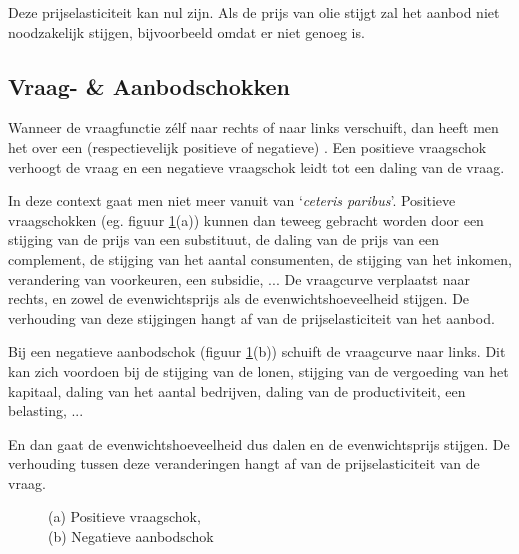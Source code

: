 Deze prijselasticiteit kan nul zijn. Als de prijs van olie stijgt zal het aanbod niet noodzakelijk stijgen, bijvoorbeeld omdat er niet genoeg is.

\subsection{Vraag- \& Aanbodschokken}\label{sec:h2veas}

Wanneer de vraagfunctie z\'elf naar rechts of naar links verschuift, dan heeft men het over een (respectievelijk positieve of negatieve) . Een positieve vraagschok verhoogt de vraag en een negatieve vraagschok leidt tot een daling van de vraag.\\

\par In deze context gaat men niet meer vanuit van `\textit{ceteris paribus}'. Positieve vraagschokken (eg. figuur \ref{fig:h2-schok}(a)) kunnen dan teweeg gebracht worden door een stijging van de prijs van een substituut, de daling van de prijs van een complement, de stijging van het aantal consumenten, de stijging van het inkomen, verandering van voorkeuren, een subsidie, ... De vraagcurve verplaatst naar rechts, en zowel de evenwichtsprijs als de evenwichtshoeveelheid stijgen. De verhouding van deze stijgingen hangt af van de prijselasticiteit van het aanbod.\\

\par Bij een negatieve aanbodschok (figuur \ref{fig:h2-schok}(b)) schuift de vraagcurve naar links. Dit kan zich voordoen bij de stijging van de lonen, stijging van de vergoeding van het kapitaal, daling van het aantal bedrijven, daling van de productiviteit, een belasting, ...
\par En dan gaat de evenwichtshoeveelheid dus dalen en de evenwichtsprijs stijgen. De verhouding tussen deze veranderingen hangt af van de prijselasticiteit van de vraag.

\begin{figure}[H]
\centering
\captionsetup{justification=centering,margin=2cm}
\caption{(a) Positieve vraagschok, \\(b) Negatieve aanbodschok}
\label{fig:h2-schok}
\end{figure}

